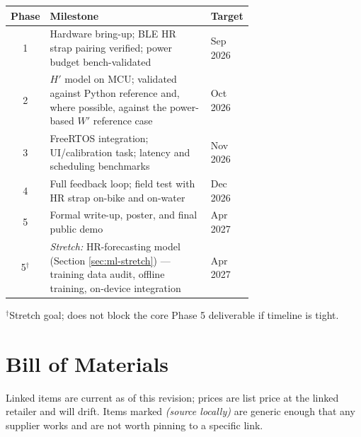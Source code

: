 \documentclass[11pt, letterpaper]{article}
\begin{document}
\begin{center}
\begin{longtable}{cp{0.68\linewidth}l}
\toprule
\textbf{Phase} & \textbf{Milestone} & \textbf{Target} \\
\midrule
1 & Hardware bring-up; BLE HR strap pairing verified; power budget bench-validated & Sep 2026 \\
2 & $H'$ model on MCU; validated against Python reference and, where possible, against the
    power-based $W'$ reference case & Oct 2026 \\
3 & FreeRTOS integration; UI/calibration task; latency and scheduling benchmarks & Nov 2026 \\
4 & Full feedback loop; field test with HR strap on-bike and on-water & Dec 2026 \\
5 & Formal write-up, poster, and final public demo & Apr 2027 \\
5$^\dagger$ & \textit{Stretch:} HR-forecasting model (Section \ref{sec:ml-stretch}) --- training data
    audit, offline training, on-device integration & Apr 2027 \\
\bottomrule
\end{longtable}
{\small $^\dagger$Stretch goal; does not block the core Phase 5 deliverable if timeline is tight.}
\end{center}

\section{Bill of Materials}
\label{sec:bom}

Linked items are current as of this revision; prices are list price at the linked retailer and
will drift. Items marked \textit{(source locally)} are generic enough that any supplier works
and are not worth pinning to a specific link.
\end{document}
